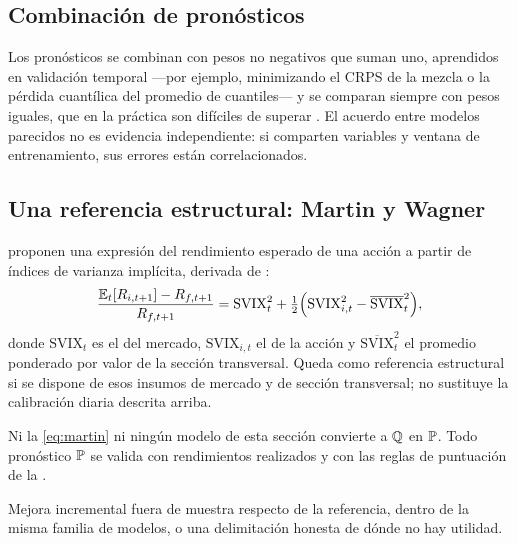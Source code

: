 \subsection{Combinación de pronósticos}\label{sec:combinacion}

Los pronósticos se combinan con pesos no negativos que suman uno, aprendidos en validación temporal
---por ejemplo, minimizando el CRPS de la mezcla o la pérdida cuantílica del promedio de cuantiles--- y se
comparan siempre con pesos iguales, que en la práctica son difíciles de superar \citep{timmermann2006}.
El acuerdo entre modelos parecidos no es evidencia independiente: si comparten variables y ventana de
entrenamiento, sus errores están correlacionados.

\subsection{Una referencia estructural: Martin y Wagner}\label{sec:martin}

\citet{martin2019} proponen una expresión del rendimiento esperado de una acción a partir de índices de
varianza implícita, derivada de \citet{martin2017}:
\begin{equation}
\frac{\E_t[R_{i,t+1}]-R_{f,t+1}}{R_{f,t+1}}=\mathrm{SVIX}_t^2+\tfrac12\Bigl(\mathrm{SVIX}_{i,t}^2-\overline{\mathrm{SVIX}}_t^2\Bigr),
\label{eq:martin}
\end{equation}
donde $\mathrm{SVIX}_t$ es el del mercado, $\mathrm{SVIX}_{i,t}$ el de la acción y
$\overline{\mathrm{SVIX}}_t^2$ el promedio ponderado por valor de la sección transversal. Queda como
referencia estructural si se dispone de esos insumos de mercado y de sección transversal; no sustituye la
calibración diaria descrita arriba.

\begin{noconcluir}
Ni la \eqref{eq:martin} ni ningún modelo de esta sección convierte a $\Q$ en $\P$. Todo pronóstico $\P$ se
valida con rendimientos realizados y con las reglas de puntuación de la .
\end{noconcluir}

\begin{criterio}
Mejora incremental fuera de muestra respecto de la referencia, dentro de la misma familia de modelos, o
una delimitación honesta de dónde no hay utilidad.
\end{criterio}
